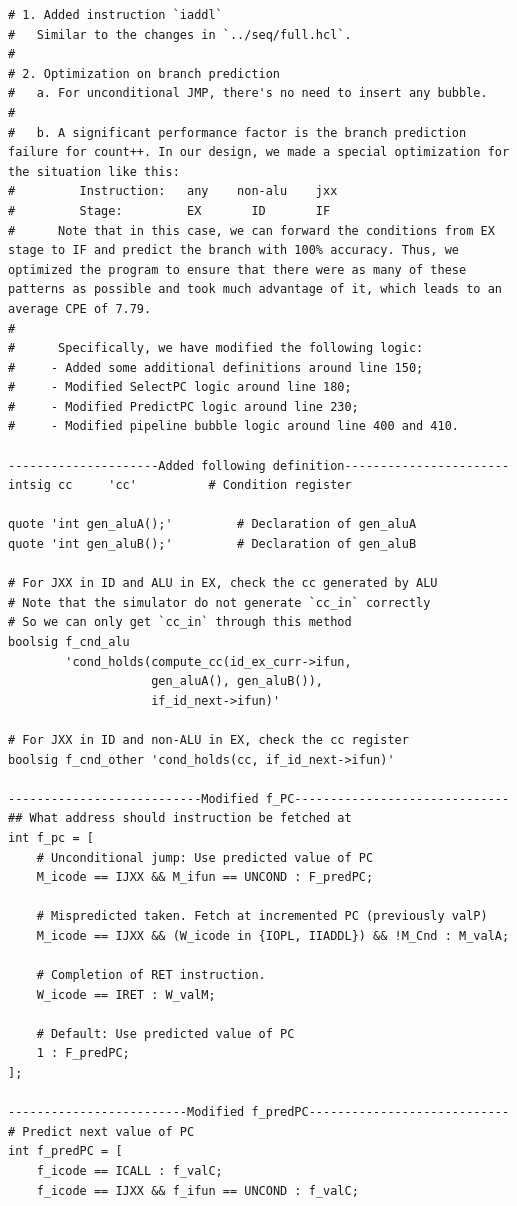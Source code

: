 \documentclass[12pt,a4paper]{article}
\begin{document}
\begin{lstlisting} 
# 1. Added instruction `iaddl`
#   Similar to the changes in `../seq/full.hcl`.
#
# 2. Optimization on branch prediction
#   a. For unconditional JMP, there's no need to insert any bubble.
#
#   b. A significant performance factor is the branch prediction failure for count++. In our design, we made a special optimization for the situation like this:
#         Instruction:   any    non-alu    jxx
#         Stage:         EX       ID       IF
#      Note that in this case, we can forward the conditions from EX stage to IF and predict the branch with 100% accuracy. Thus, we optimized the program to ensure that there were as many of these patterns as possible and took much advantage of it, which leads to an average CPE of 7.79.
#
#      Specifically, we have modified the following logic:
#     - Added some additional definitions around line 150;
#     - Modified SelectPC logic around line 180;
#     - Modified PredictPC logic around line 230;
#     - Modified pipeline bubble logic around line 400 and 410.

---------------------Added following definition-----------------------
intsig cc     'cc'			# Condition register

quote 'int gen_aluA();'			# Declaration of gen_aluA
quote 'int gen_aluB();'			# Declaration of gen_aluB

# For JXX in ID and ALU in EX, check the cc generated by ALU
# Note that the simulator do not generate `cc_in` correctly
# So we can only get `cc_in` through this method
boolsig f_cnd_alu 
        'cond_holds(compute_cc(id_ex_curr->ifun, 
                    gen_aluA(), gen_aluB()), 
                    if_id_next->ifun)'

# For JXX in ID and non-ALU in EX, check the cc register
boolsig f_cnd_other 'cond_holds(cc, if_id_next->ifun)'

---------------------------Modified f_PC------------------------------
## What address should instruction be fetched at
int f_pc = [
	# Unconditional jump: Use predicted value of PC
	M_icode == IJXX && M_ifun == UNCOND : F_predPC;

	# Mispredicted taken. Fetch at incremented PC (previously valP)
	M_icode == IJXX && (W_icode in {IOPL, IIADDL}) && !M_Cnd : M_valA;

	# Completion of RET instruction.
	W_icode == IRET : W_valM;

	# Default: Use predicted value of PC
	1 : F_predPC;
];

-------------------------Modified f_predPC----------------------------
# Predict next value of PC
int f_predPC = [
	f_icode == ICALL : f_valC;
	f_icode == IJXX && f_ifun == UNCOND : f_valC;


\end{lstlisting}
\end{document}
